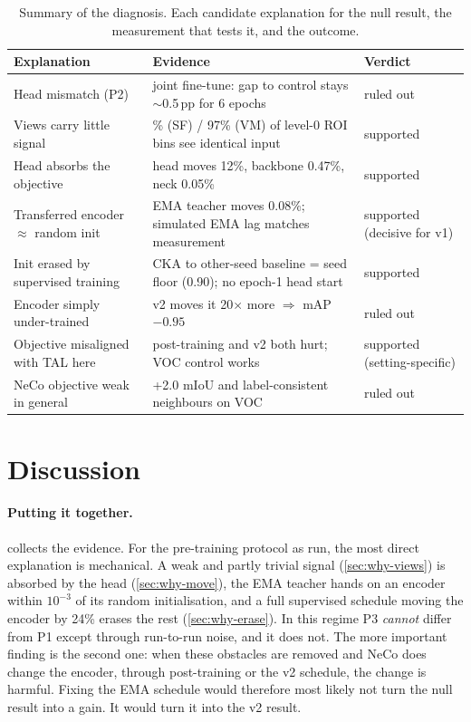 \documentclass[10pt,a4paper]{article}
\newcommand{\pp}{\,pp}
\begin{document}
\begin{table}[t]
\centering\small
\caption{Summary of the diagnosis. Each candidate explanation for the null result, the
measurement that tests it, and the outcome.}
\label{tab:diagnosis}
\begin{tabular}{>{\raggedright\arraybackslash}p{4.3cm}>{\raggedright\arraybackslash}p{7.5cm}>{\raggedright\arraybackslash}p{3.6cm}}
\toprule
Explanation & Evidence & Verdict \\
\midrule
Head mismatch (P2) & joint fine-tune: gap to control stays $\sim$0.5\pp{} for 6 epochs & ruled out \\
Views carry little signal & 93\% (SF) / 97\% (VM) of level-0 ROI bins see identical input & supported \\
Head absorbs the objective & head moves 12\%, backbone 0.47\%, neck 0.05\% & supported \\
Transferred encoder $\approx$ random init & EMA teacher moves 0.08\%; simulated EMA lag matches measurement & supported (decisive for v1) \\
Init erased by supervised training & CKA to other-seed baseline = seed floor (0.90); no epoch-1 head start & supported \\
Encoder simply under-trained & v2 moves it 20$\times$ more $\Rightarrow$ mAP $-0.95$ & ruled out \\
Objective misaligned with TAL here & post-training and v2 both hurt; VOC control works & supported (setting-specific) \\
NeCo objective weak in general & +2.0 mIoU and label-consistent neighbours on VOC & ruled out \\
\bottomrule
\end{tabular}
\end{table}

\section{Discussion}\label{sec:discussion}

\paragraph{Putting it together.}  collects the evidence. For the
pre-training protocol as run, the most direct explanation is mechanical. A weak and
partly trivial signal (\cref{sec:why-views}) is absorbed by the head
(\cref{sec:why-move}), the EMA teacher hands on an encoder within $10^{-3}$ of its random
initialisation, and a full supervised schedule moving the encoder by 24\% erases the rest
(\cref{sec:why-erase}). In this regime P3 \emph{cannot} differ from P1 except through
run-to-run noise, and it does not. The more important finding is the second one: when
these obstacles are removed and NeCo does change the encoder, through post-training or
the v2 schedule, the change is harmful. Fixing the EMA schedule would therefore most
likely not turn the null result into a gain. It would turn it into the v2 result.
\end{document}
